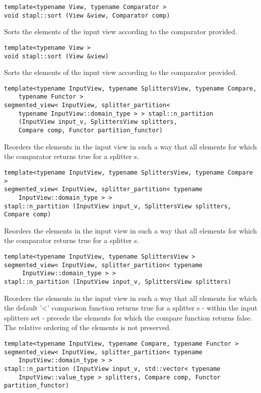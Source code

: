 \begin{verbatim}
template<typename View, typename Comparator >
void stapl::sort (View &view, Comparator comp)
\end{verbatim}

Sorts the elements of the input view according to the comparator provided.

\begin{verbatim}
template<typename View >
void stapl::sort (View &view)
\end{verbatim}

Sorts the elements of the input view according to the comparator provided.

\begin{verbatim}
template<typename InputView, typename SplittersView, typename Compare,
    typename Functor >
segmented_view< InputView, splitter_partition<
    typename InputView::domain_type > > stapl::n_partition
    (InputView input_v, SplittersView splitters,
    Compare comp, Functor partition_functor)
\end{verbatim}

Reorders the elements in the input view in such a way that all elements for which the comparator returns true for a splitter s.

\begin{verbatim}
template<typename InputView, typename SplittersView, typename Compare >
segmented_view< InputView, splitter_partition< typename
    InputView::domain_type > >
stapl::n_partition (InputView input_v, SplittersView splitters, Compare comp)
\end{verbatim}

Reorders the elements in the input view in such a way that all elements for which the comparator returns true for a splitter s.

\begin{verbatim}
template<typename InputView, typename SplittersView >
segmented_view< InputView, splitter_partition< typename
     InputView::domain_type > >
stapl::n_partition (InputView input_v, SplittersView splitters)
\end{verbatim}

Reorders the elements in the input view in such a way that all elements for which the default '<' comparison function returns true for a splitter s - within the input splitters set - precede the elements for which the compare function returns false. The relative ordering of the elements is not preserved.

\begin{verbatim}
template<typename InputView, typename Compare, typename Functor >
segmented_view< InputView, splitter_partition< typename
    InputView::domain_type > >
stapl::n_partition (InputView input_v, std::vector< typename
    InputView::value_type > splitters, Compare comp, Functor partition_functor)
\end{verbatim}

